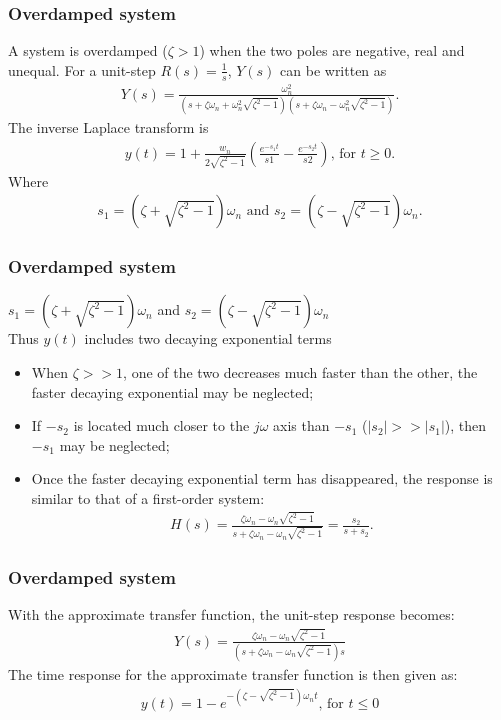 \begin{frame}
\frametitle{Overdamped system}
A system is overdamped ($\zeta>1$) when the two poles are negative, real and unequal.
\vspace{0.25cm}
For a unit-step $R(s)=\frac{1}{s}$, $Y(s)$ can be written as
\vspace{-0.5cm}
\begin{align*}
Y(s) = \frac{\omega_n ^2}{(s+\zeta\omega_n + \omega_n ^2\sqrt{\zeta^2 -1})(s+\zeta\omega_n - \omega_n ^2\sqrt{\zeta^2 -1})}.
\end{align*} 
The inverse Laplace transform is
\vspace{-0.5cm}
\begin{align*}
y(t) = 1 +\frac{w_n}{2\sqrt{\zeta^2-1}}(\frac{e^{-s_1 t}}{s1} - \frac{e^{-s_2 t}}{s2})\text{, for } t\ge 0.
\end{align*}
Where
\vspace{-0.5cm}
\begin{align*}
s_1 = (\zeta +\sqrt{\zeta^2 -1})\omega_n\text{ and } s_2 = (\zeta -\sqrt{\zeta^2 -1})\omega_n.
\end{align*}
\end{frame}

\begin{frame}
\frametitle{Overdamped system}
$s_1 = (\zeta +\sqrt{\zeta^2 -1})\omega_n$ and $s_2 = (\zeta -\sqrt{\zeta^2 -1})\omega_n$
\\ Thus $y(t)$ includes two decaying exponential terms
\begin{itemize}
\item When $\zeta >> 1$, one of the two decreases much faster than the other, the faster decaying exponential may be neglected;
\item If $-s_2$ is located much closer to the $j\omega$ axis than $-s_1$ ($|s_2|>>|s_1|$), then $-s_1$ may be neglected;
\item Once the faster decaying exponential term has disappeared, the response is similar to that of a first-order system:
\begin{align*}
H(s) = \frac{\zeta\omega_n - \omega_n\sqrt{\zeta^2-1}}{s+\zeta\omega_n -\omega_n\sqrt{\zeta^2-1}}=\frac{s_2}{s+s_2}.
\end{align*}
\end{itemize}
\end{frame}

\begin{frame}
\frametitle{Overdamped system}
With the approximate transfer function, the unit-step response becomes:
\begin{align*}
 Y(s) = \frac{\zeta\omega_n - \omega_n\sqrt{\zeta^2-1}}{(s+\zeta\omega_n -\omega_n\sqrt{\zeta^2-1})s}
\end{align*}
The time response for the approximate transfer function is then given as:\\ 
\begin{align*}
y(t)= 1 -e^{-(\zeta-\sqrt{\zeta^2 -1})\omega_n t}\text{, for }t\le 0
\end{align*}
\end{frame}

